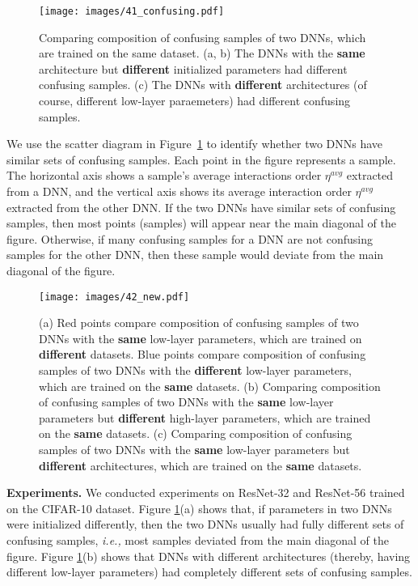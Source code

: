 \documentclass[10pt,twocolumn,letterpaper]{article}
\begin{document}
\begin{figure}[t]
    \centering
    \texttt{[image: images/41\_confusing.pdf]}
    \vspace{-15pt}
    \caption{Comparing composition of confusing samples of two DNNs, which are trained on the same dataset. (a, b) The DNNs with the \textbf{same} architecture but \textbf{different} initialized parameters had different confusing samples. (c) The DNNs with \textbf{different} architectures (of course, different low-layer paraemeters) had different confusing samples.}
    \vspace{-10pt}
    \label{ref::fig41}
\end{figure}

We use the scatter diagram in Figure~\ref{ref::fig41} to identify whether two DNNs have similar sets of confusing samples. Each point in the figure represents a sample. The horizontal axis shows a sample's average interactions order $\eta^{avg}$ extracted from a DNN, and the vertical axis shows its average interaction order $\eta^{avg}$ extracted from the other DNN.
If the two DNNs have similar sets of confusing samples, then most points (samples) will appear near the main diagonal of the figure. Otherwise, if many confusing samples for a DNN are not confusing samples for the other DNN, then these sample would deviate from the main diagonal of the figure.

\begin{figure*}[t]
    \centering
    \texttt{[image: images/42\_new.pdf]}
    \vspace{-5pt}
    \caption{(a) Red points compare composition of confusing samples of two DNNs with the \textbf{same} low-layer parameters, which are trained on \textbf{different} datasets. Blue points compare composition of confusing samples of two DNNs with the \textbf{different} low-layer parameters, which are trained on the \textbf{same} datasets. (b) Comparing composition of confusing samples of two DNNs with the \textbf{same} low-layer parameters but \textbf{different} high-layer parameters, which are trained on the \textbf{same} datasets. (c) Comparing composition of confusing samples of two DNNs with the  \textbf{same} low-layer parameters but \textbf{different} architectures, which are trained on the \textbf{same} datasets.}
    \label{ref::fig42}
\end{figure*}

\textbf{Experiments.} We conducted experiments on ResNet-32 and ResNet-56 trained on the CIFAR-10 dataset. Figure \ref{ref::fig41}(a) shows that, if parameters in two DNNs were initialized differently, then the two DNNs usually had fully different sets of confusing samples, \emph{i.e.,} most samples deviated from the main diagonal of the figure. Figure \ref{ref::fig41}(b) shows that DNNs with different architectures (thereby, having different low-layer parameters) had completely different sets of confusing samples.
\end{document}
